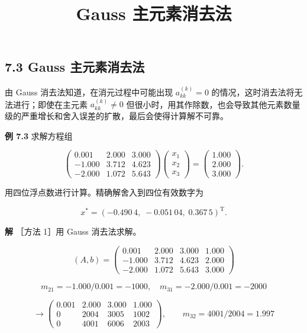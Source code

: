 \documentclass[
  10pt,
  fontset=fandol]{ctexart}
\title{Gauss 主元素消去法}
\author{}
\date{}
\begin{document}
\maketitle

\subsection{7.3 Gauss 主元素消去法}\label{gauss-ux4e3bux5143ux7d20ux6d88ux53bbux6cd5}

由 Gauss 消去法知道，在消元过程中可能出现 \(a_{kk}^{(k)}=0\) 的情况，这时消去法将无法进行；即使在主元素 \(a_{kk}^{(k)}\ne0\) 但很小时，用其作除数，也会导致其他元素数量级的严重增长和舍入误差的扩散，最后会使得计算解不可靠。

\textbf{例 7.3} 求解方程组

\[
\begin{pmatrix}
0.001&2.000&3.000\\
-1.000&3.712&4.623\\
-2.000&1.072&5.643
\end{pmatrix}
\begin{pmatrix}x_1\\x_2\\x_3\end{pmatrix}
=\begin{pmatrix}1.000\\2.000\\3.000\end{pmatrix}.
\]

用四位浮点数进行计算。精确解舍入到四位有效数字为

\[x^*=(-0.490\,4,\;-0.051\,04,\;0.367\,5)^{\mathrm T}.\]

\textbf{解} ［方法 1］用 Gauss 消去法求解。

\[
(A,b)=\left(\begin{array}{rrr|r}
0.001&2.000&3.000&1.000\\
-1.000&3.712&4.623&2.000\\
-2.000&1.072&5.643&3.000
\end{array}\right)
\]

\[m_{21}=-1.000/0.001=-1000,\quad m_{31}=-2.000/0.001=-2000\]

\[
\longrightarrow\left(\begin{array}{rrr|r}
0.001&2.000&3.000&1.000\\
0&2004&3005&1002\\
0&4001&6006&2003
\end{array}\right),\qquad m_{32}=4001/2004=1.997
\]
\end{document}
